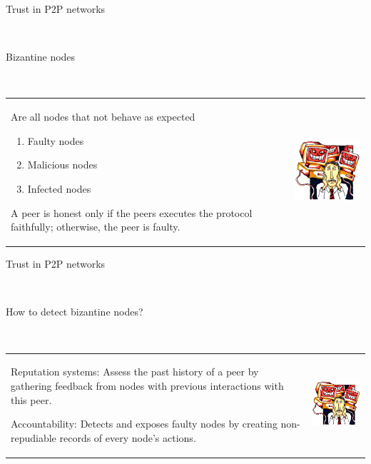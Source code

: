 \documentclass[12pt]{beamer}
\renewcommand{\frametitle}[1]{\vspace{0.2cm}\begin{huge}#1\end{huge}\\}
\renewcommand{\framesubtitle}[1]{\vspace{0.4cm} \hspace{0.4cm}\begin{large}#1\end{large}\\}
\begin{document}
  \begin{frame}
  \frametitle{Trust in P2P networks}
  \framesubtitle{Bizantine nodes}
  \begin{table}
  \begin{tabular}{p{7cm}p{3cm}}
  Are all nodes that not behave as expected
  \begin{enumerate}
      \item Faulty nodes
      \item Malicious nodes
      \item Infected nodes
  \end{enumerate}
    A peer is honest only if the peers executes the protocol faithfully;
    otherwise, the peer is faulty.
  &
  \vspace{1.5cm}
  \includegraphics[width=4cm]{../../presentacion/img/malicious}\\
  \end{tabular}
  \end{table}
  \end{frame}
  
  \begin{frame}
  \frametitle{Trust in P2P networks}
  \framesubtitle{How to detect bizantine nodes?}
  \begin{table}
  \begin{tabular}{p{7cm}p{3cm}}
  \begin{description}
      \item{Reputation systems:} Assess the past history of a
  peer by gathering feedback from nodes with previous interactions with this
  peer.
      \item{Accountability:} Detects and exposes faulty nodes by
  creating non-repudiable records of every node’s actions.
  \end{description}
  &
  \vspace{1.5cm}
  \includegraphics[width=4cm]{../../presentacion/img/malicious}\\
  \end{tabular}
  \end{table}
  \end{frame}
\end{document}
